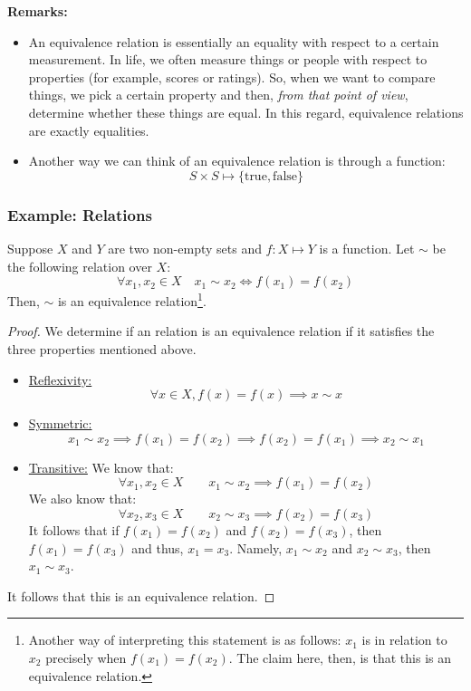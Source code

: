 \documentclass[letterpaper]{article}
\begin{document}
\textbf{Remarks:}
\begin{itemize}
    \item An equivalence relation is essentially an equality with respect to a certain measurement. In life, we often measure things or people with respect to properties (for example, scores or ratings). So, when we want to compare things, we pick a certain property and then, \emph{from that point of view}, determine whether these things are equal. In this regard, equivalence relations are exactly equalities. 
    \item Another way we can think of an equivalence relation is through a function: 
    \[S \times S \mapsto \{\text{true}, \text{false}\}\]
\end{itemize} 

\subsubsection{Example: Relations}
Suppose $X$ and $Y$ are two non-empty sets and $f: X \mapsto Y$ is a function. Let $\sim$ be the following relation over $X$:
\[\forall x_1, x_2 \in X \quad x_1 \sim x_2 \iff f(x_1) = f(x_2)\]
Then, $\sim$ is an equivalence relation\footnote{Another way of interpreting this statement is as follows: $x_1$ is in relation to $x_2$ precisely when $f(x_1) = f(x_2)$. The claim here, then, is that this is an equivalence relation.}.

\begin{mdframed}
    \begin{proof}
        We determine if an relation is an equivalence relation if it satisfies the three properties mentioned above.
        \begin{itemize}
            \item \underline{Reflexivity:}
            \[\forall x \in X, f(x) = f(x) \implies x \sim x\]
    
            \item \underline{Symmetric:}
            \[x_1 \sim x_2 \implies f(x_1) = f(x_2) \implies f(x_2) = f(x_1) \implies x_2 \sim x_1\]
    
            \item \underline{Transitive:}
            We know that:
            \[\forall x_1, x_2 \in X \qquad x_1 \sim x_2 \implies f(x_1) = f(x_2)\]
            We also know that:
            \[\forall x_2, x_3 \in X \qquad x_2 \sim x_3 \implies f(x_2) = f(x_3)\]
            It follows that if $f(x_1) = f(x_2)$ and $f(x_2) = f(x_3)$, then $f(x_1) = f(x_3)$ and thus, $x_1 = x_3$. Namely, $x_1 \sim x_2$ and $x_2 \sim x_3$, then $x_1 \sim x_3$. 
        \end{itemize}
        It follows that this is an equivalence relation. 
    \end{proof}
\end{mdframed}
\end{document}

